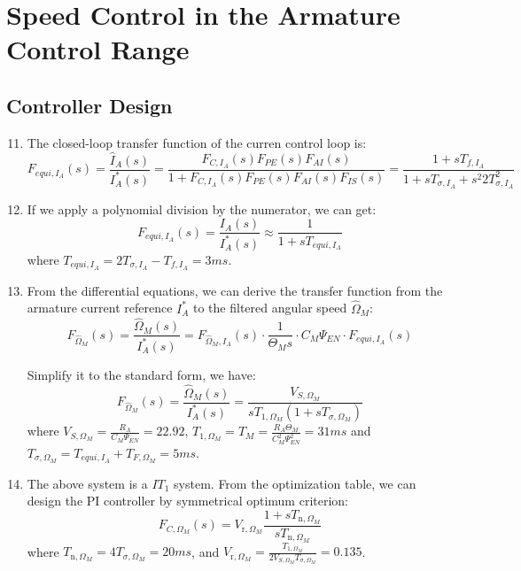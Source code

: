 \documentclass[12pt,a4paper, openany]{book}
\begin{document}
\section{Speed Control in the Armature Control Range}
\subsection{Controller Design}
\begin{enumerate}
\setcounter{enumi}{10} %
\item {\bf *} 
The closed-loop transfer function of the curren control loop is:
\begin{equation}
    F_{equi,I_A}(s) = \frac{\hat{I}_A(s)}{I_A^*(s)} = \frac{F_{C,I_A}(s)F_{PE}(s) F_{AI}(s) }{1 + F_{C,I_A}(s)F_{PE}(s) F_{AI}(s) F_{IS}(s)}=\frac{1+sT_{f,I_{A}}}{1+sT_{\sigma,I_{A}}+s^{2}2T_{\sigma,I_{A}}^{2}}
\end{equation}
\item {\bf *} If we  apply a polynomial division by the numerator, we can get:
\begin{equation}
    F_{equi,I_A}(s)=\frac{I_A(s)}{I_A^*(s)}\approx\frac{1}{1+sT_{equi,I_A}}
\end{equation}
where $T_{equi,I_A} = 2T_{\sigma,I_A} - T_{f,I_A} = 3ms$.
\item {\bf *}   
From the differential equations, we can derive the transfer function from the armature current reference $I^*_A$ to the filtered angular speed $\hat{\Omega}_M$:
\begin{equation}
    F_{\hat{\Omega}_M}(s) = \frac{\hat{\Omega}_M(s)}{I_A^*(s)} = F_{\hat{\Omega}_M,I_A}(s) \cdot \frac{1}{\Theta_M s} \cdot C_M \Psi_{EN} \cdot F_{equi,I_A}(s)
\end{equation}

Simplify it to the standard form, we have:
\begin{equation}
    F_{\hat{\Omega}_M}(s)=\frac{\hat{\Omega}_M(s)}{I_A^*(s)}=\frac{V_{S,\Omega_M}}{sT_{1,\Omega_M}(1+sT_{\sigma,\Omega_M})}
\end{equation}
where $V_{S,\Omega_M} = \frac{R_A}{C_M \Psi_{EN}}=22.92$, $T_{1,\Omega_M} = T_M=\frac{R_A\Theta_M}{C_M^2\Psi_{EN}^2}=31ms$ and $T_{\sigma,\Omega_M} = T_{equi,I_A}+T_{F,\Omega_M}=5ms$.
\item {\bf *}
The above system is a $IT_1$ system. From the optimization table, we can design the PI controller by symmetrical optimum criterion:
\begin{equation}
    F_{C,\Omega_M}(s)=V_{\mathrm{r},\Omega_M}\frac{1+sT_{\mathrm{n},\Omega_M}}{sT_{\mathrm{n},\Omega_M}}
\end{equation}
where $T_{\mathrm{n},\Omega_M} = 4T_{\sigma,\Omega_M}=20ms$, and $V_{\mathrm{r},\Omega_M} = \frac{T_{1,\Omega_M}}{2V_{S,\Omega_M}T_{\sigma,\Omega_M}}=0.135$.
\end{enumerate}
\end{document}
